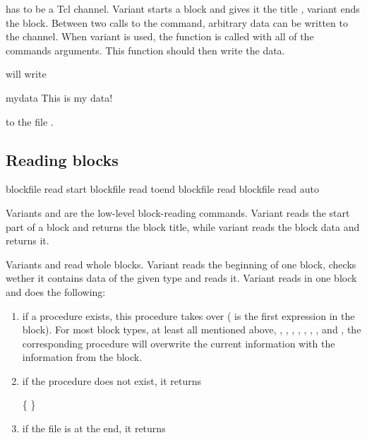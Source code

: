  has to be a Tcl channel. Variant  starts a
block and gives it the title , variant  ends the
block. Between two calls to the command, arbitrary data can be written
to the channel.  When variant  is used, the function
 is called with all of the commands
arguments. This function should then write the data.


will write 
\begin{tclcode}
{mydata {This is my data!}}
\end{tclcode}
to the file .


\subsection{Reading blocks}

\begin{essyntax}
   blockfile  read start 
   blockfile  read toend 
   blockfile  read 
   blockfile  read auto 
\end{essyntax}

Variants  and  are the low-level block-reading
commands. Variant  reads the start part of a block and
returns the block title, while variant  reads the block
data and returns it.

Variants  and  read whole blocks.  Variant
 reads the beginning of one block, checks wether it
contains data of the given type and reads it. Variant 
reads in one block and does the following:
\begin{enumerate}
\item if a procedure  exists,
  this procedure takes over ( is the first expression in the
  block). For most block types, at least all mentioned above, \ie
  , , ,
  , , ,
  , and , the corresponding
  procedure will overwrite the current information with the
  information from the block.
\item if the procedure does not exist, it returns 
  \begin{code}
    \{   \}
  \end{code}
\item if the file is at the end, it returns 
\end{enumerate}

